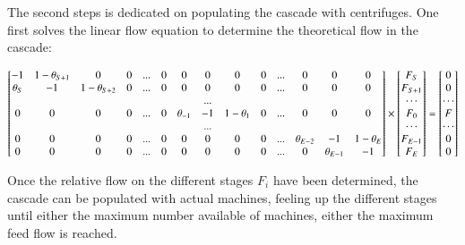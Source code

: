 \documentclass{anstrans}
\begin{document}
The second steps is dedicated on populating the cascade with centrifuges. One
first solves the linear flow equation to determine the theoretical flow in the
cascade:
\begin{strip}
\begin{equation}
\setcounter{MaxMatrixCols}{20}
\begin{bmatrix}
-1         & 1-\theta_{S+1} & 0              & 0 & ... & 0 & 0            & 0   & 0              & 0 & ... & 0            & 0            & 0 \\
\theta_{S} & -1             & 1-\theta_{S+2} & 0 & ... & 0 & 0            & 0   & 0              & 0 & ... & 0            & 0            & 0 \\
           &                &                &   &     &   &              & ... &                &   &     &              &              &   \\
0          & 0              & 0              & 0 & ... & 0 & \theta_{-1}  & -1  & 1 - \theta_{1} & 0 & ... & 0            & 0            & 0 \\
           &                &                &   &     &   &              & ... &                &   &     &              &              &   \\
0          & 0              & 0              & 0 & ... & 0 & 0            & 0   & 0              & 0 & ... & \theta_{E-2} & -1           & 1-\theta_{E} \\
0          & 0              & 0              & 0 & ... & 0 & 0            & 0   & 0              & 0 & ... & 0            & \theta_{E-1} & -1
\end{bmatrix}
\times 
\begin{bmatrix}
     F_{S}   \\
     F_{S+1} \\
     \cdots  \\
     F_{0}   \\
    \cdots   \\
    F_{E-1}  \\
    F_{E}
\end{bmatrix}
=
\begin{bmatrix}
     0   \\
     0 \\
     \cdots  \\
     F   \\
    \cdots   \\
    0  \\
    0
\end{bmatrix}
\label{eq:flow}
\end{equation}
\end{strip}
Once the relative flow on the different stages $F_{i}$ have been determined, the
cascade can be populated with actual machines, feeling up the different stages
until either the maximum number available of machines, either the maximum feed
flow is reached.
\end{document}
